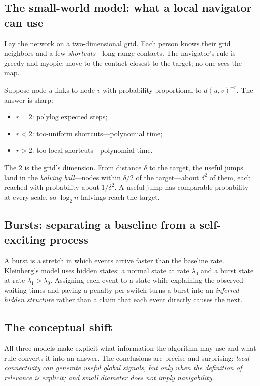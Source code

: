 \subsection{The small-world model: what a local navigator can use}
Lay the network on a two-dimensional grid. Each person knows their grid neighbors and a few \emph{shortcuts}---long-range contacts. The navigator's rule is greedy and myopic: move to the contact closest to the target; no one sees the map.

Suppose node $u$ links to node $v$ with probability proportional to $d(u,v)^{-r}$. The answer is sharp:
\begin{itemize}
\item $r=2$: polylog expected steps;
\item $r<2$: too-uniform shortcuts---polynomial time;
\item $r>2$: too-local shortcuts---polynomial time.
\end{itemize}
The $2$ is the grid's dimension. From distance $\delta$ to the target, the useful jumps land in the \emph{halving ball}---nodes within $\delta/2$ of the target---about $\delta^{2}$ of them, each reached with probability about $1/\delta^{2}$. A useful jump has comparable probability at every scale, so $\log_2 n$ halvings reach the target.

\subsection{Bursts: separating a baseline from a self-exciting process}
A burst is a stretch in which events arrive faster than the baseline rate. Kleinberg's model uses hidden states: a normal state at rate $\lambda_0$ and a burst state at rate $\lambda_1>\lambda_0$. Assigning each event to a state while explaining the observed waiting times and paying a penalty per switch turns a burst into an \emph{inferred hidden structure} rather than a claim that each event directly causes the next.

\subsection{The conceptual shift}
All three models make explicit what information the algorithm may use and what rule converts it into an answer. The conclusions are precise and surprising: \emph{local connectivity can generate useful global signals, but only when the definition of relevance is explicit; and small diameter does not imply navigability.}

